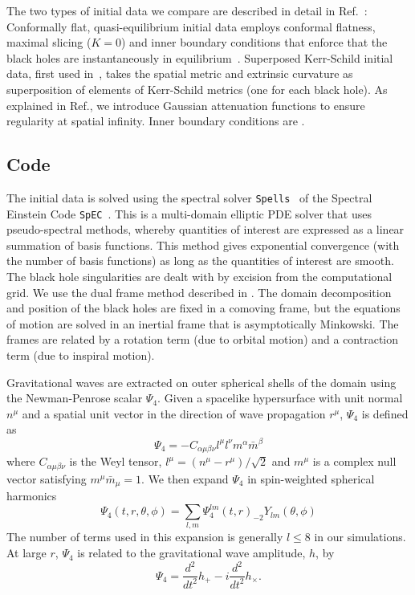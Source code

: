 The two types of initial data we compare are described in detail in
Ref.~\cite{Lovelace2008}: Conformally flat, quasi-equilibrium initial
data employs conformal flatness, maximal slicing ($K=0$) and inner
boundary conditions that enforce that the black holes are
instantaneously in
equilibrium~\cite{Caudill-etal:2006,Cook2004,Cook2002}.  Superposed
Kerr-Schild initial data, first used
in~\cite{Marronetti-Matzner:2000,Matzner1999}, takes the spatial
metric and extrinsic curvature as superposition of elements of
Kerr-Schild metrics (one for each black hole).  As explained in
Ref.\cite{Lovelace2008}, we introduce Gaussian attenuation functions
to ensure regularity at spatial infinity.  Inner boundary conditions
are .



\subsection{Code}
\label{sec:Code}

The initial data is solved using the spectral solver {\tt Spells}~\cite{Pfeiffer2003} of the Spectral 
 Einstein Code {\tt SpEC}~\cite{SpECwebsite}.  This is a
multi-domain elliptic PDE solver that uses pseudo-spectral methods,
whereby quantities of interest are expressed as a linear summation of
basis functions. This method gives exponential convergence (with the
number of basis functions) as long as the quantities of interest are
smooth. The black hole singularities are dealt with by excision from
the computational grid. We use the dual frame method described in
\cite{Scheel2006}. The domain decomposition and position of the black
holes are fixed in a comoving frame, but the equations of motion are
solved in an inertial frame that is asymptotically Minkowski. The
frames are related by a rotation term (due to orbital motion) and a
contraction term (due to inspiral motion).

Gravitational waves are extracted on outer spherical shells of the
domain using the Newman-Penrose scalar $\Psi_4$. Given a spacelike
hypersurface with unit normal $n^{\mu}$ and a spatial unit vector in
the direction of wave propagation $r^{\mu}$, $\Psi_4$ is defined as 
\begin{equation}
\Psi_4 = -C_{\alpha\mu\beta\nu}l^{\mu}l^{\nu}m^{\alpha}\bar{m}^{\beta}
\end{equation}
where $C_{\alpha\mu\beta\nu}$ is the Weyl tensor,
$l^{\mu}=\left(n^{\mu}-r^{\mu}\right)/\sqrt{2}$ and $m^{\mu}$ is a
complex null vector satisfying $m^{\mu}\bar{m}_{\mu}=1$. We then expand
$\Psi_4$ in spin-weighted spherical harmonics
\begin{equation}
\Psi_4(t,r,\theta,\phi)=\sum_{l,m}{\Psi_4^{lm}(t,r)_{-2}Y_{lm}(\theta,\phi)}
\end{equation}
The number of terms used in this expansion is generally $l\le 8$ in
our simulations. At large $r$, $\Psi_4$ is related to the
gravitational wave amplitude, $h$, by
\begin{equation}
\Psi_4=\frac{d^2}{dt^2}h_{+}-i\frac{d^2}{dt^2}h_{\times}.
\end{equation}


